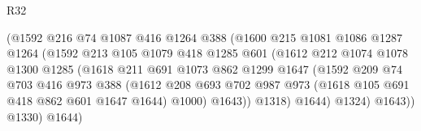 \begin{lexlean}{R32}
\begin{coremodule}
                                  (@1592
                                    @216
                                    @74
                                    @1087
                                    @416
                                    @1264
                                    @388
                                    (@1600
                                      @215
                                      @1081
                                      @1086
                                      @1287
                                      @1264
                                      (@1592
                                        @213
                                        @105
                                        @1079
                                        @418
                                        @1285
                                        @601
                                        (@1612
                                          @212
                                          @1074
                                          @1078
                                          @1300
                                          @1285
                                          (@1618
                                            @211
                                            @691
                                            @1073
                                            @862
                                            @1299
                                            @1647
                                            (@1592
                                              @209
                                              @74
                                              @703
                                              @416
                                              @973
                                              @388
                                              (@1612
                                                @208
                                                @693
                                                @702
                                                @987
                                                @973
                                                (@1618 @105 @691 @418 @862 @601 @1647 @1644)
                                                @1000)
                                              @1643))
                                          @1318)
                                        @1644)
                                      @1324)
                                    @1643))
                                @1330)
                              @1644)

\end{coremodule}
\end{lexlean}

